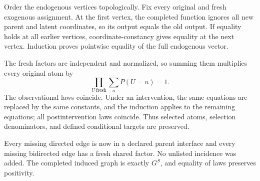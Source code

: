 Order the endogenous vertices topologically. Fix every original and fresh exogenous assignment. At the first vertex, the completed function ignores all new parent and latent coordinates, so its output equals the old output. If equality holds at all earlier vertices, coordinate-constancy gives equality at the next vertex. Induction proves pointwise equality of the full endogenous vector.

The fresh factors are independent and normalized, so summing them multiplies every original atom by
\[
 \prod_{U\ \mathrm{fresh}}\sum_uP(U=u)=1.
\]
The observational laws coincide. Under an intervention, the same equations are replaced by the same constants, and the induction applies to the remaining equations; all postintervention laws coincide. Thus selected atoms, selection denominators, and defined conditional targets are preserved.

Every missing directed edge is now in a declared parent interface and every missing bidirected edge has a fresh shared factor. No unlisted incidence was added. The completed induced graph is exactly \(G^S\), and equality of laws preserves positivity.